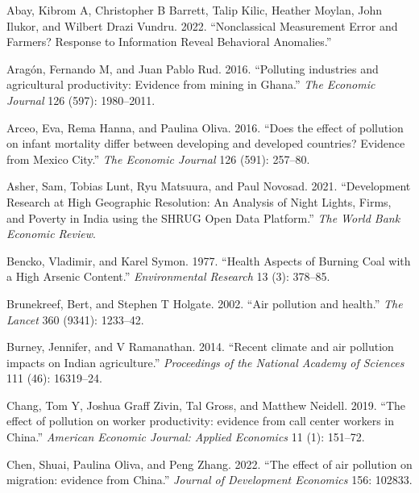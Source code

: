 \documentclass[
]{article}
\newlength{\cslhangindent}
\newlength{\cslentryspacingunit} %
\newenvironment{CSLReferences}[2] %
 {%
  \setlength{\parindent}{0pt}
  \ifodd #1
  \let\oldpar\par
  \def\par{\hangindent=\cslhangindent\oldpar}
  \fi
  \setlength{\parskip}{#2\cslentryspacingunit}
 }%
 {}
\begin{document}
\hypertarget{refs}{}
\begin{CSLReferences}{1}{0}
\leavevmode{}%
Abay, Kibrom A, Christopher B Barrett, Talip Kilic, Heather Moylan, John Ilukor, and Wilbert Drazi Vundru. 2022. {``{Nonclassical Measurement Error and Farmers? Response to Information Reveal Behavioral Anomalies}.''}

\leavevmode{}%
Aragón, Fernando M, and Juan Pablo Rud. 2016. {``{Polluting industries and agricultural productivity: Evidence from mining in Ghana}.''} \emph{{The Economic Journal}} 126 (597): 1980--2011.

\leavevmode{}%
Arceo, Eva, Rema Hanna, and Paulina Oliva. 2016. {``{Does the effect of pollution on infant mortality differ between developing and developed countries? Evidence from Mexico City}.''} \emph{{The Economic Journal}} 126 (591): 257--80.

\leavevmode{}%
Asher, Sam, Tobias Lunt, Ryu Matsuura, and Paul Novosad. 2021. {``{Development Research at High Geographic Resolution: An Analysis of Night Lights, Firms, and Poverty in India using the SHRUG Open Data Platform}.''} \emph{{The World Bank Economic Review}}.

\leavevmode{}%
Bencko, Vladimir, and Karel Symon. 1977. {``Health Aspects of Burning Coal with a High Arsenic Content.''} \emph{{Environmental Research}} 13 (3): 378--85.

\leavevmode{}%
Brunekreef, Bert, and Stephen T Holgate. 2002. {``{Air pollution and health}.''} \emph{{The Lancet}} 360 (9341): 1233--42.

\leavevmode{}%
Burney, Jennifer, and V Ramanathan. 2014. {``{Recent climate and air pollution impacts on Indian agriculture}.''} \emph{{Proceedings of the National Academy of Sciences}} 111 (46): 16319--24.

\leavevmode{}%
Chang, Tom Y, Joshua Graff Zivin, Tal Gross, and Matthew Neidell. 2019. {``{The effect of pollution on worker productivity: evidence from call center workers in China}.''} \emph{{American Economic Journal: Applied Economics}} 11 (1): 151--72.

\leavevmode{}%
Chen, Shuai, Paulina Oliva, and Peng Zhang. 2022. {``{The effect of air pollution on migration: evidence from China}.''} \emph{{Journal of Development Economics}} 156: 102833.


\end{CSLReferences}
\end{document}
